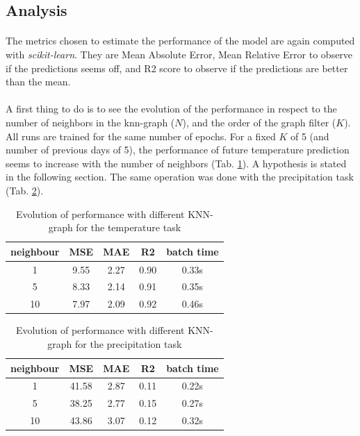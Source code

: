 \documentclass[11pt]{report}
\begin{document}
\subsection{Analysis}
\paragraph*{}
The metrics chosen to estimate the performance of the model are again computed with \emph{scikit-learn}. They are Mean Absolute Error, Mean Relative Error to observe if the predictions seems off, and R2 score to observe if the predictions are better than the mean.

\paragraph*{}
A first thing to do is to see the evolution of the performance in respect to the number of neighbors in the knn-graph ($N$), and the order of the graph filter ($K$). All runs are trained for the same number of epochs.
For a fixed $K$ of 5 (and number of previous days of 5), the performance of future temperature prediction seems to increase with the number of neighbors (Tab. \ref{tab:knn_temp}). A hypothesis is stated in the following section. The same operation was done with the precipitation task (Tab. \ref{tab:knn_prec}).

\begin{table}[!ht]
    \centering
    \begin{tabular}{c|cccc}
neighbour & MSE & MAE & R2 & batch time \\ \hline
        1 & 9.55 & 2.27 & 0.90 & 0.33s\\
        5 & 8.33 & 2.14 & 0.91 & 0.35s\\
       10 & 7.97 & 2.09 & 0.92 & 0.46s
    \end{tabular}
    \caption{Evolution of performance with different KNN-graph for the temperature task}
    \label{tab:knn_temp}
\end{table}

\begin{table}[!ht]
    \centering
    \begin{tabular}{c|cccc}
neighbour & MSE & MAE & R2 & batch time \\ \hline
        1 & 41.58 & 2.87 & 0.11 & 0.22s\\
        5 & 38.25 & 2.77 & 0.15 & 0.27s\\
       10 & 43.86 & 3.07 & 0.12 & 0.32s
    \end{tabular}
    \caption{Evolution of performance with different KNN-graph for the precipitation task}
    \label{tab:knn_prec}
\end{table}
\end{document}
